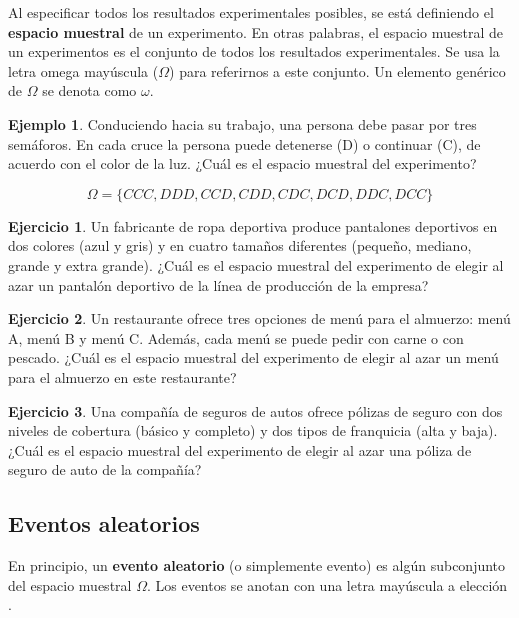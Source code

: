 \documentclass[
  11pt,
]{book}
\theoremstyle{definition}
\theoremstyle{definition}
\newtheorem{example}{Ejemplo}[chapter]
\theoremstyle{definition}
\newtheorem{exercise}{Ejercicio}[chapter]
\theoremstyle{definition}
\theoremstyle{remark}
\begin{document}
Al especificar todos los resultados experimentales posibles, se está definiendo el \textbf{espacio muestral} de un experimento. En otras palabras, el espacio muestral de un experimentos es el conjunto de todos los resultados experimentales. Se usa la letra omega mayúscula (\(\Omega\)) para referirnos a este conjunto. Un elemento genérico de \(\Omega\) se denota como \(\omega\).

\begin{example}
Conduciendo hacia su trabajo, una persona debe pasar por tres semáforos. En cada cruce la persona puede detenerse (D) o continuar (C), de acuerdo con el color de la luz. ¿Cuál es el espacio muestral del experimento?

\[\Omega = \lbrace CCC, DDD, CCD, CDD, CDC, DCD, DDC, DCC \rbrace\]
\end{example}

\begin{exercise}
Un fabricante de ropa deportiva produce pantalones deportivos en dos colores (azul y gris) y en cuatro tamaños diferentes (pequeño, mediano, grande y extra grande). ¿Cuál es el espacio muestral del experimento de elegir al azar un pantalón deportivo de la línea de producción de la empresa?
\end{exercise}

\begin{exercise}
Un restaurante ofrece tres opciones de menú para el almuerzo: menú A, menú B y menú C. Además, cada menú se puede pedir con carne o con pescado. ¿Cuál es el espacio muestral del experimento de elegir al azar un menú para el almuerzo en este restaurante?
\end{exercise}

\begin{exercise}
Una compañía de seguros de autos ofrece pólizas de seguro con dos niveles de cobertura (básico y completo) y dos tipos de franquicia (alta y baja). ¿Cuál es el espacio muestral del experimento de elegir al azar una póliza de seguro de auto de la compañía?
\end{exercise}

\subsection{Eventos aleatorios}\label{eventos-aleatorios}

En principio, un \textbf{evento aleatorio} (o simplemente evento) es algún subconjunto del espacio muestral \(\Omega\). Los eventos se anotan con una letra mayúscula a elección \citep[página 153]{anderson}.
\end{document}
